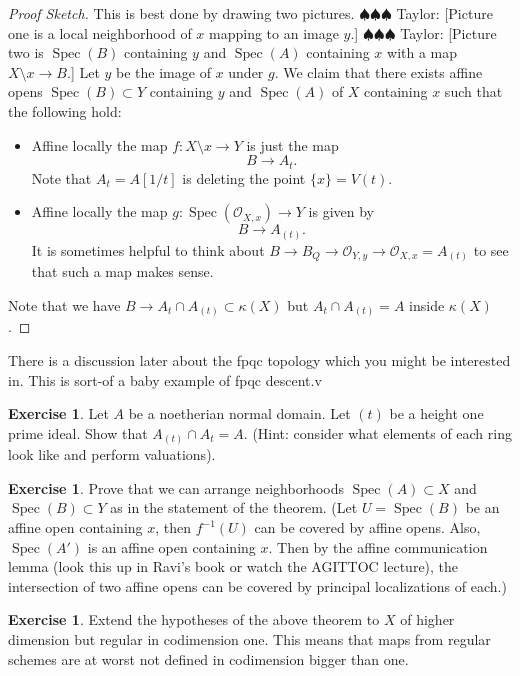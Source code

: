 \documentclass[12pt]{article}
\numberwithin{equation}{section}
\theoremstyle{definition}
\newtheorem{exercise}[theorem]{Exercise}
\theoremstyle{remark}
\newcommand{\Ocal}{\mathcal{O}}
\newcommand{\Spec}{\operatorname{Spec}}
\newcommand{\taylor}[1]{{\color{blue} \sf $\spadesuit\spadesuit\spadesuit$ Taylor: [#1]}}
\begin{document}
\begin{proof}[Proof Sketch]
	This is best done by drawing two pictures.
	\taylor{Picture one is a local neighborhood of $x$ mapping to an image $y$.}
	\taylor{Picture two is $\Spec(B)$ containing $y$ and $\Spec(A)$ containing $x$ with a map $X\setminus x \to B$.}
	Let $y$ be the image of $x$ under $g$.
	We claim that there exists affine opens $\Spec(B) \subset Y$ containing $y$ and $\Spec(A)$ of $X$ containing $x$ such that the following hold:
	\begin{itemize}
		\item Affine locally the map $f: X\setminus x \to Y$ is just the map
		$$B \to A_t.$$
		Note that $A_t = A[1/t]$ is deleting the point $\lbrace x\rbrace=V(t)$.
		\item Affine locally the map $g: \Spec(\Ocal_{X,x}) \to Y$ is given by 
		$$ B \to A_{(t)}.$$
		It is sometimes helpful to think about $B \to B_Q \to \Ocal_{Y,y} \to \Ocal_{X,x} = A_{(t)}$ to see that such a map makes sense.
	\end{itemize}
	Note that we have $B \to A_t \cap A_{(t)} \subset \kappa(X)$ but $A_t \cap A_{(t)} = A$ inside $\kappa(X)$.
\end{proof}

There is a discussion later about the fpqc topology which you might be interested in. 
This is sort-of a baby example of fpqc descent.v

\begin{exercise}
	Let $A$ be a noetherian normal domain. 
	Let $(t)$ be a height one prime ideal. 
	Show that $A_{(t)} \cap A_t = A$.  (Hint: consider what elements of each ring look like and perform valuations).
\end{exercise}

\begin{exercise}
	Prove that we can arrange neighborhoods $\Spec(A)\subset X$ and $\Spec(B)\subset Y$ as in the statement of the theorem. 
	(Let $U=\Spec(B)$ be an affine open containing $x$, then $f^{-1}(U)$ can be covered by affine opens. Also, $\Spec(A')$ is an affine open containing $x$. 
	Then by the affine communication lemma (look this up in Ravi's book or watch the AGITTOC lecture), the intersection of two affine opens can be covered by principal localizations of each.)
\end{exercise}

\begin{exercise}
	Extend the hypotheses of the above theorem to $X$ of higher dimension but regular in codimension one. 
	This means that maps from regular schemes are at worst not defined in codimension bigger than one.
\end{exercise}
\end{document}
